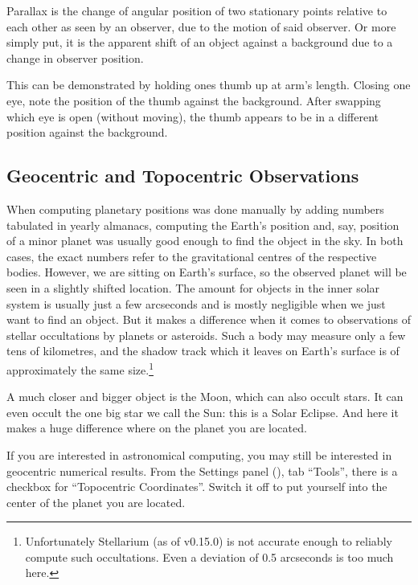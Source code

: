 Parallax is the change of angular position of two stationary points
relative to each other as seen by an observer, due to the motion of said
observer. Or more simply put, it is the apparent shift of an object
against a background due to a change in observer position.

This can be demonstrated by holding ones thumb up at arm's length.
Closing one eye, note the position of the thumb against the background.
After swapping which eye is open (without moving), the thumb appears to
be in a different position against the background.

\subsection{Geocentric and Topocentric Observations}
\label{sec:Concepts:Parallax:Topocentric}


When computing planetary positions was done manually by adding numbers
tabulated in yearly almanacs, computing the Earth's position and, say,
position of a minor planet was usually good enough to find the object
in the sky. In both cases, the exact numbers refer to the
gravitational centres of the respective bodies. However, we are
sitting on Earth's surface, so the observed planet will be seen in a
slightly shifted location. The amount for objects in the inner solar
system is usually just a few arcseconds and is mostly negligible when we
just want to find an object. But it makes a difference when it comes
to observations of stellar occultations by planets or asteroids. Such
a body may measure only a few tens of kilometres, and the shadow track
which it leaves on Earth's surface is of approximately the same
size.\footnote{Unfortunately Stellarium (as of v0.15.0) is not accurate
  enough to reliably compute such occultations. Even a deviation of
  0.5 arcseconds is too much here.}

A much closer and bigger object is the Moon, which can also occult
stars. It can even occult the one big star we call the Sun: this is a
Solar Eclipse. And here it makes a huge difference where on the planet
you are located. 

If you are interested in astronomical computing, you may still be
interested in geocentric numerical results. From the Settings panel
(), tab ``Tools'', there is a checkbox for ``Topocentric
Coordinates''. Switch it off to put yourself into the center of the
planet you are located.


